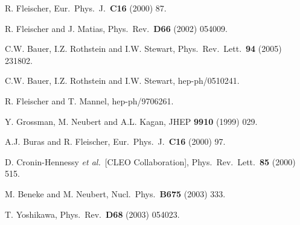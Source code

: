 \documentclass[12pt]{article}
\begin{document}
\begin{thebibliography}{999}
 R. Fleischer,
 {  Eur.\ Phys.\ J.}~{\bf C16} (2000) 87.

R. Fleischer and J. Matias,
{ Phys.\ Rev.}~{\bf D66} (2002) 054009.

C.W. Bauer, I.Z. Rothstein and I.W. Stewart,
  { Phys.\ Rev.\ Lett.}~{\bf 94} (2005) 231802.
  
C.W. Bauer, I.Z. Rothstein and I.W. Stewart,
  hep-ph/0510241.
  
  R. Fleischer and T. Mannel,
  hep-ph/9706261.

Y. Grossman, M. Neubert and A.L. Kagan,
  { JHEP} {\bf 9910} (1999) 029.

A.J. Buras and R. Fleischer,
{ Eur.\ Phys.\ J.}~{\bf C16} (2000) 97.

D. Cronin-Hennessy {\it et al.}\  [CLEO Collaboration],
  { Phys.\ Rev.\ Lett.}~{\bf 85} (2000) 515.

M. Beneke and M. Neubert,
  { Nucl.\ Phys.}~{\bf B675} (2003) 333.

T. Yoshikawa,
  { Phys.\ Rev.}~{\bf D68} (2003) 054023.
 

\end{thebibliography}
\end{document}
